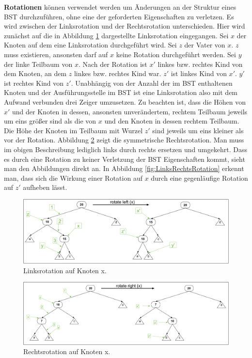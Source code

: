 \documentclass[a4paper,12pt]{article}
\begin{document}
\noindent\textbf{Rotationen} können verwendet werden um Änderungen an der Struktur eines BST durchzuführen, ohne eine der geforderten Eigenschaften zu verletzen. Es wird zwischen der Linksrotation und der Rechtsrotation 
unterschieden. Hier wird zunächst auf die in Abbildung \ref{fig:Linksrotation} dargestellte Linksrotation eingegangen. 
Sei $x$ der Knoten auf dem eine Linksrotation durchgeführt wird. Sei $z$ der Vater von $x$. $z$ muss existieren, ansonsten darf auf $x$ keine Rotation durchgeführt werden. Sei $y$ der linke Teilbaum von $x$. Nach der Rotation ist $x'$ linkes bzw. rechtes Kind von dem Knoten, an dem $z$ linkes bzw. rechtes Kind war. $z'$ ist linkes Kind von $x'$. $y'$ ist rechtes Kind von $z'$. Unabhängig von der Anzahl der im BST enthaltenen Knoten und der Ausführungsstelle im BST ist eine Linksrotation also mit dem Aufwand verbunden drei Zeiger umzusetzen. Zu beachten ist, dass die Höhen von $x'$ und der Knoten in dessen, ansonsten unverändertem, rechtem Teilbaum jeweils um eins größer sind als die von $x$ und den Knoten in dessen rechtem Teilbaum. Die Höhe der Knoten im Teilbaum mit Wurzel $z'$ sind jeweils um eins kleiner als vor der Rotation.
 Abbildung \ref{fig:Rechtsrotation} zeigt die symmetrische Rechtsrotation. Man muss im obigen Beschreibung lediglich links durch rechts ersetzen und umgekehrt. Dass es durch eine Rotation zu keiner Verletzung der BST Eigenschaften kommt, sieht man den Abbildungen direkt an. In Abbildung \ref{fig:LinksRechtsRotation} erkennt man, dass sich die Wirkung einer Rotation auf $x$ durch eine gegenläufige Rotation auf $z'$ aufheben lässt.  
\begin{figure}[h]
	\centering
	\includegraphics[width= 1.2\textwidth]{"Medien/Einleitung/Linksrotation"}
	\caption{Linksrotation auf Knoten x. }
	\label{fig:Linksrotation}
\end{figure}
\begin{figure}[h]
	\centering
	\includegraphics[width= 1.2\textwidth]{"Medien/Einleitung/Rechtsrotation"}
	\caption{Rechtsrotation auf Knoten x. }
	\label{fig:Rechtsrotation}
\end{figure}
\end{document}
